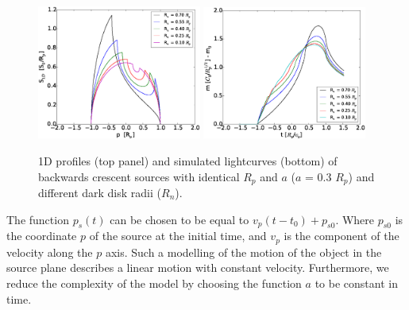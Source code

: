 \documentclass[usenatbib]{mn2e}
\begin{document}
\begin{figure}
\centering
    \includegraphics[width = 0.48\textwidth]{figures/S1D_var_rn_a_poz.eps}
    \includegraphics[width = 0.48\textwidth]{figures/5Rn_back_var_magnification.eps}
\caption{\label{fig:lightcurve_crescent_back} 1D profiles (top panel) and simulated lightcurves (bottom) of backwards crescent sources with identical $R_p$ and $a$ ($a$ = 0.3 $R_p$) and different dark disk radii ($R_n$).}
\end{figure}

The function $p_s(t)$ can be chosen to be equal to $v_p(t-t_0) + p_{s0}$. Where $p_{s0}$ is the coordinate $p$ 
of the source at the initial time, and $v_p$ is the component of the velocity
along the $p$ axis. Such a modelling of the motion of the object in the source 
plane describes a linear motion with constant velocity. Furthermore, we reduce the complexity of the model by 
choosing the function $a$ to be constant in time.  
\end{document}

